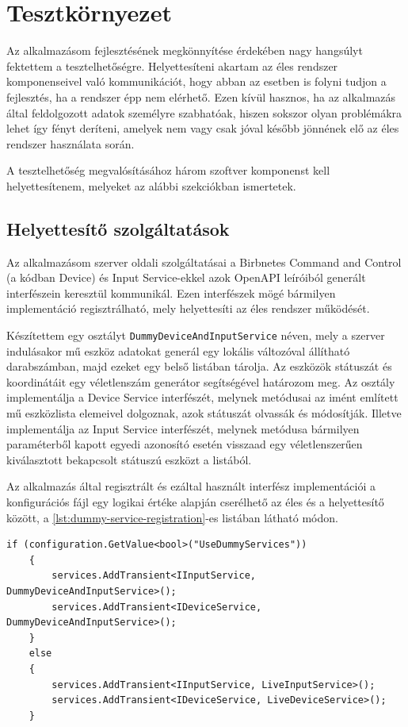 \chapter{Tesztkörnyezet}
\label{chapt:birdmap-test}
Az alkalmazásom fejlesztésének megkönnyítése érdekében nagy hangsúlyt fektettem a tesztelhetőségre.
Helyettesíteni akartam az éles rendszer komponenseivel való kommunikációt,
hogy abban az esetben is folyni tudjon a fejlesztés, ha a rendszer épp nem elérhető.
Ezen kívül hasznos, ha az alkalmazás által feldolgozott adatok személyre szabhatóak,
hiszen sokszor olyan problémákra lehet így fényt deríteni, amelyek nem vagy csak jóval később jönnének elő az éles rendszer használata során.

A tesztelhetőség megvalósításához három szoftver komponenst kell helyettesítenem,
melyeket az alábbi szekciókban ismertetek.
\section{Helyettesítő szolgáltatások}
Az alkalmazásom szerver oldali szolgáltatásai a Birbnetes Command and Control (a kódban Device) és Input Service-ekkel azok OpenAPI leíróiból generált interfészein keresztül kommunikál.
Ezen interfészek mögé bármilyen implementáció regisztrálható, mely helyettesíti az éles rendszer működését.

Készítettem egy osztályt \verb+DummyDeviceAndInputService+ néven, mely a szerver indulásakor mű eszköz adatokat generál egy lokális változóval állítható darabszámban,
majd ezeket egy belső listában tárolja. Az eszközök státuszát és koordinátáit egy véletlenszám generátor segítségével határozom meg.
Az osztály implementálja a Device Service interfészét, melynek metódusai az imént említett mű eszközlista elemeivel dolgoznak,
azok státuszát olvassák és módosítják.
Illetve implementálja az Input Service interfészét, 
melynek metódusa bármilyen paraméterből kapott egyedi azonosító esetén visszaad egy véletlenszerűen kiválasztott bekapcsolt státuszú eszközt a listából.

Az alkalmazás által regisztrált és ezáltal használt interfész implementációi a konfigurációs fájl egy logikai értéke alapján cserélhető az éles és a helyettesítő között,
a \ref{lst:dummy-service-registration}-es listában látható módon.
\newpage
\begin{lstlisting}[style=csharp, caption=A helyettesítő és az éles szolgáltatások regisztrálásának logikája, label=lst:dummy-service-registration]
    if (configuration.GetValue<bool>("UseDummyServices"))
    {
        services.AddTransient<IInputService, DummyDeviceAndInputService>();
        services.AddTransient<IDeviceService, DummyDeviceAndInputService>();
    }
    else
    {
        services.AddTransient<IInputService, LiveInputService>();
        services.AddTransient<IDeviceService, LiveDeviceService>();
    }
\end{lstlisting}


